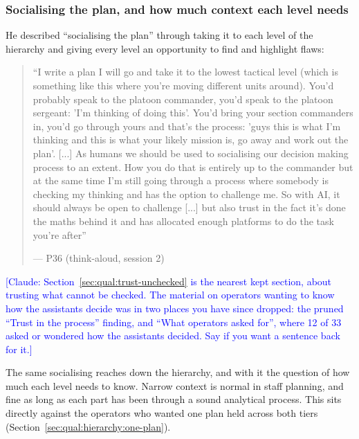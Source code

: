 \subsubsection{Socialising the plan, and how much context each level needs}\label{sec:qual:practitioner:pt-trust-but-verify}\label{sec:qual:practitioner:pt-silos}\label{sec:qual:practitioner:pt-one-up-two-down}

He described ``socialising the plan'' through taking it to each level of the hierarchy and giving every level an opportunity to find and highlight flaws:

\begin{quote}\small
``I write a plan I will go and take it to the lowest tactical level (which is something like this where you're moving different units around). You'd probably speak to the platoon commander, you'd speak to the platoon sergeant: 'I'm thinking of doing this'. You'd bring your section commanders in, you'd go through yours and that's the process: 'guys this is what I'm thinking and this is what your likely mission is, go away and work out the plan'. [...] As humans we should be used to socialising our decision making process to an extent. How you do that is entirely up to the commander but at the same time I'm still going through a process where somebody is checking my thinking and has the option to challenge me. So with AI, it should always be open to challenge [...] but also trust in the fact it's done the maths behind it and has allocated enough platforms to do the task you're after''\par\hfill--- P36 (think-aloud, session 2)
\end{quote}

\textcolor{blue}{[Claude: Section~\ref{sec:qual:trust-unchecked} is the nearest kept section, about trusting what cannot be checked. The material on operators wanting to know how the assistants decide was in two places you have since dropped: the pruned ``Trust in the process'' finding, and ``What operators asked for'', where 12 of 33 asked or wondered how the assistants decided. Say if you want a sentence back for it.]}

{\color{blue}The same socialising reaches down the hierarchy, and with it the question of how much each level needs to know. Narrow context is normal in staff planning, and fine as long as each part has been through a sound analytical process. This sits directly against the operators who wanted one plan held across both tiers (Section~\ref{sec:qual:hierarchy:one-plan}).}


